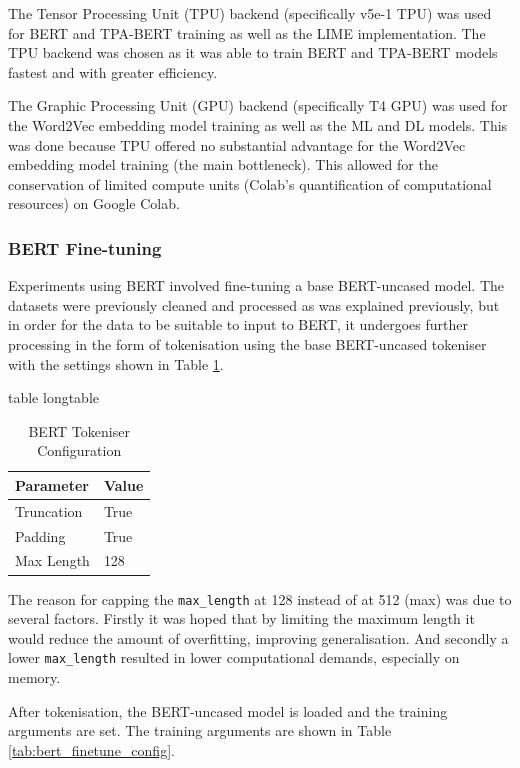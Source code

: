 \documentclass[stu,12pt,floatsintext,donotrepeattitle]{apa7}
\makeatletter
\let\origcaption\caption
\newcommand{\@tabletype}{table}
\newcommand{\@longtabletype}{longtable}
\DeclareRobustCommand{\caption}[2][]{%
    \ifx\relax#1\relax
      \origcaption{#2}%
      \def\temp@cap{#2}%
    \else
      \origcaption[#1]{#2}%
      \def\temp@cap{#1}%
    \fi
    \ifx\@captype\@tabletype
      \ifx\@currenvir\@longtabletype\else
        \addcontentsline{lot}{table}{\protect\numberline{\thetable}{\ignorespaces\temp@cap}}%
      \fi
    \fi
  }%
\let\oldcaption\caption
\renewcommand{\caption}[2][]{%
    \oldcaption[#1]{#2}%
    \vspace{-12pt}%
  }%
\makeatother
\begin{document}
The Tensor Processing Unit (TPU) backend (specifically v5e-1 TPU) was used for BERT and TPA-BERT training as well as the LIME implementation. The TPU backend was chosen as it was able to train BERT and TPA-BERT models fastest and with greater efficiency. 

The Graphic Processing Unit (GPU) backend (specifically T4 GPU) was used for the Word2Vec embedding model training as well as the ML and DL models. This was done because TPU offered no substantial advantage for the Word2Vec embedding model training (the main bottleneck). This allowed for the conservation of limited compute units (Colab's quantification of computational resources) on Google Colab. 

\subsubsection{BERT Fine-tuning}
Experiments using BERT involved fine-tuning a base BERT-uncased model. The datasets were previously cleaned and processed as was explained previously, but in order for the data to be suitable to input to BERT, it undergoes further processing in the form of tokenisation using the base BERT-uncased tokeniser with the settings shown in Table \ref{tab:bert_tokeniser_config}. 

\vspace{25pt}

\begin{table}[H]
    \centering
    \caption{BERT Tokeniser Configuration}
    \label{tab:bert_tokeniser_config}
    \begin{tabular}{l l}
        \hline
        \textbf{Parameter} & \textbf{Value} \\
        \hline
        Truncation & True \\
        Padding & True \\
        Max Length & 128 \\
        \hline
    \end{tabular}
\end{table}

The reason for capping the \texttt{max\_length} at 128 instead of at 512 (max) was due to several factors. Firstly it was hoped that by limiting the maximum length it would reduce the amount of overfitting, improving generalisation. And secondly a lower \texttt{max\_length} resulted in lower computational demands, especially on memory. 

After tokenisation, the BERT-uncased model is loaded and the training arguments are set. The training arguments are shown in Table \ref{tab:bert_finetune_config}.
\end{document}
